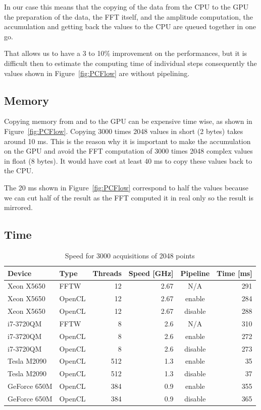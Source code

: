 In our case this means that the copying of the data from the \gls{CPU} to the \gls{GPU} the preparation of the data, the \gls{FFT} itself, and the amplitude computation, the accumulation and getting back the values to the \gls{CPU} are queued together in one go.

That allows us to have a 3 to 10\% improvement on the performances, but it is difficult then to estimate the computing time of individual steps consequently the values shown in Figure~\ref{fig:PCFlow} are without pipelining.

\subsection{Memory}

Copying memory from and to the \gls{GPU} can be expensive time wise, as shown in Figure~\ref{fig:PCFlow}. Copying 3000 times 2048 values in short (2 bytes) takes around 10 ms. This is the reason why it is important to make the accumulation on the \gls{GPU} and avoid the \gls{FFT} computation of 3000 times 2048 complex values in float (8 bytes). It would have cost at least 40 ms to copy these values back to the \gls{CPU}. 

The 20 ms shown in Figure~\ref{fig:PCFlow} correspond to half the values because we can cut half of the result as the \gls{FFT} computed it in real only so the result is mirrored.

\subsection{Time}

\begin{table}[H]
\caption{Speed for 3000 acquisitions of 2048 points}
\centering
\label{tab:speed}
\begin{tabular}{|l|lrrcr|}
\hline
Device & Type & Threads & Speed [GHz] & Pipeline & Time [ms] \\
\hline
\hline
Xeon X5650 & FFTW & 12 & 2.67 & N/A & 291 \\
Xeon X5650 & OpenCL & 12 & 2.67 & enable & 284 \\
Xeon X5650 & OpenCL & 12 & 2.67 & disable & 288 \\
\hline
i7-3720QM & FFTW & 8 & 2.6 & N/A & 310 \\
i7-3720QM & OpenCL & 8 & 2.6 & enable & 272 \\
i7-3720QM & OpenCL & 8 & 2.6 & disable & 273 \\
\hline
\hline
Tesla M2090 & OpenCL & 512 & 1.3 & enable & 35 \\
Tesla M2090 & OpenCL & 512 & 1.3 & disable & 37 \\
\hline
GeForce 650M & OpenCL & 384 & 0.9 & enable & 355 \\
GeForce 650M & OpenCL & 384 & 0.9 & disable & 365 \\
\hline
\end{tabular}
\end{table}

